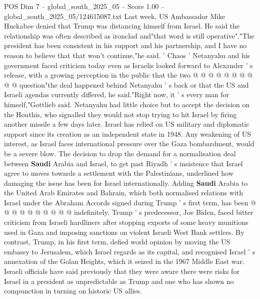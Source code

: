 \begin{textsample}{POS Dim 7 – global\_south\_2025\_05 – Score 1.00 – global\_south\_2025\_05/124615087.txt}
Last week, US Ambassador Mike Huckabee denied that Trump was distancing himself from Israel.
He said the relationship was often described as ironclad and"that word is still operative"."The president has been consistent in his support and his partnership, and I have no reason to believe that that won't continue,"he said. ' Chaos ' Netanyahu and his government faced criticism today even as Israelis looked forward to Alexander ' s release, with a growing perception in the public that the two @ @ @ @ @ @ @ @ @ @ question"the deal happened behind Netanyahu ' s back or that the US and Israeli agendas currently differed, he said."Right now, it ' s every man for himself,"Gottlieb said.
Netanyahu had little choice but to accept the decision on the Houthis, who signalled they would not stop trying to hit Israel by firing another missile a few days later.
Israel has relied on US military and diplomatic support since its creation as an independent state in 1948.
Any weakening of US interest, as Israel faces international pressure over the Gaza bombardment, would be a severe blow.
The decision to drop the demand for a normalisation deal between \textbf{Saudi} Arabia and Israel, to get past Riyadh ' s insistence that Israel agree to moves towards a settlement with the Palestinians, underlined how damaging the issue has been for Israel internationally.
Adding \textbf{Saudi} Arabia to the United Arab Emirates and Bahrain, which both normalised relations with Israel under the Abraham Accords signed during Trump ' s first term, has been @ @ @ @ @ @ @ @ @ @ indefinitely.
Trump ' s predecessor, Joe Biden, faced bitter criticism from Israeli hardliners after stopping exports of some heavy munitions used in Gaza and imposing sanctions on violent Israeli West Bank settlers.
By contrast, Trump, in his first term, defied world opinion by moving the US embassy to Jerusalem, which Israel regards as its capital, and recognised Israel ' s annexation of the Golan Heights, which it seized in the 1967 Middle East war.
Israeli officials have said previously that they were aware there were risks for Israel in a president as unpredictable as Trump and one who has shown no compunction in turning on historic US allies.

\end{textsample}
